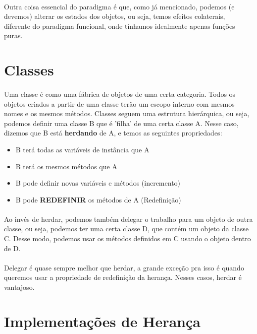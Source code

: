 \documentclass[11pt]{article}
\begin{document}
\paragraph{} Outra coisa essencial do paradigma é que, como já mencionado, podemos (e devemos) alterar os estados dos objetos, ou seja,
temos efeitos colaterais, diferente do paradigma funcional, onde tínhamos idealmente apenas funções puras.

\section{Classes}
\label{sec:org17a1fa5}
\paragraph{} Uma classe é como uma fábrica de objetos de uma certa categoria. Todos os objetos criados a partir de uma classe terão um
escopo interno com mesmos nomes e os mesmos métodos. Classes seguem uma estrutura hierárquica, ou seja, podemos definir uma classe B que é
'filha' de uma certa classe A. Nesse caso, dizemos que B está \textbf{herdando} de A, e temos as seguintes propriedades:

\begin{itemize}
\item B terá todas as variáveis de instância que A
\item B terá os mesmos métodos que A
\item B pode definir novas variáveis e métodos (incremento)
\item B pode \textbf{REDEFINIR} os métodos de A (Redefinição)
\end{itemize}

\paragraph{} Ao invés de herdar, podemos também delegar o trabalho para um objeto de outra classe, ou seja, podemos ter uma certa classe
D, que contém um objeto da classe C. Desse modo, podemos usar os métodos definidos em C usando o objeto dentro de D.

\paragraph{} Delegar é quase sempre melhor que herdar, a grande exceção pra isso é quando queremos usar a propriedade de redefinição da
herança. Nesses casos, herdar é vantajoso.

\section{Implementações de Herança}
\label{sec:org1dff818}
\end{document}
